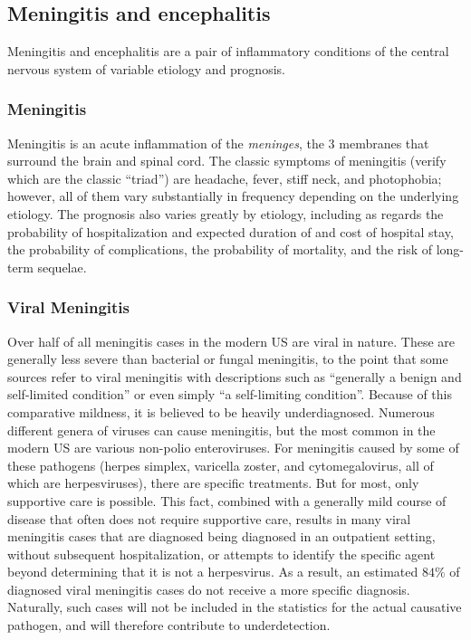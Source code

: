 \documentclass[12pt]{article}
\begin{document}
        \subsection{Meningitis and encephalitis}
            \label{m-and-e}
            Meningitis and encephalitis are a pair of inflammatory conditions of the central nervous system of variable etiology and prognosis.
            
            \subsubsection{Meningitis}
                \label{meningitis}
            Meningitis is an acute inflammation of the \textit{meninges}, the 3 membranes that surround the brain and spinal cord. The classic symptoms of meningitis (verify which are the classic ``triad'') are headache, fever, stiff neck, and photophobia; however, all of them vary substantially in frequency depending on the underlying etiology. The prognosis also varies greatly by etiology, including as regards the probability of hospitalization and expected duration of and cost of hospital stay, the probability of complications, the probability of mortality, and the risk of long-term sequelae.

        \subsubsection{Viral Meningitis}
            \label{viral-meningitis}
            Over half of all meningitis cases in the modern US are viral in nature. These are generally less severe than bacterial or fungal meningitis, to the point that some sources refer to viral meningitis with descriptions such as ``generally a benign and self-limited condition''\cite{khetsuriani2003viral} or even simply ``a self-limiting condition''\cite{balada2019cost}. Because of this comparative mildness, it is believed to be heavily underdiagnosed. Numerous different genera of viruses can cause meningitis, but the most common in the modern US are various non-polio enteroviruses. For meningitis caused by some of these pathogens (herpes simplex, varicella zoster, and cytomegalovirus, all of which are herpesviruses), there are specific treatments. But for most, only supportive care is possible. This fact, combined with a generally mild course of disease that often does not require supportive care, results in many viral meningitis cases that are diagnosed being diagnosed in an outpatient setting, without subsequent hospitalization, or attempts to identify the specific agent beyond determining that it is not a herpesvirus. As a result, an estimated $84\%$ of diagnosed viral meningitis cases do not receive a more specific diagnosis\cite{holmquist2008meningitis}. Naturally, such cases will not be included in the statistics for the actual causative pathogen, and will therefore contribute to underdetection.
\end{document}

